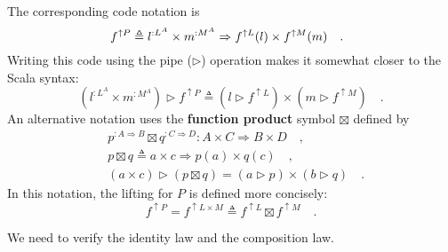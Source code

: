 \noindent The corresponding code notation is
\[
\negthickspace\negthickspace f^{\uparrow P}\triangleq l^{:L^{A}}\times m^{:M^{A}}\Rightarrow f^{\uparrow L}(l)\times f^{\uparrow M}(m)\quad.
\]
Writing this code using the pipe ($\triangleright$) operation makes
it somewhat closer to the Scala syntax:
\begin{equation}
(l^{:L^{A}}\times m^{:M^{A}})\triangleright f^{\uparrow P}\triangleq(l\triangleright f^{\uparrow L})\times(m\triangleright f^{\uparrow M})\quad.\label{eq:f-def-of-functor-product-lift}
\end{equation}
An alternative notation uses the \textbf{function
product} symbol $\boxtimes$ defined by
\begin{align*}
 & p^{:A\Rightarrow B}\boxtimes q^{:C\Rightarrow D}:A\times C\Rightarrow B\times D\quad,\\
 & p\boxtimes q\triangleq a\times c\Rightarrow p(a)\times q(c)\quad,\\
 & (a\times c)\triangleright\left(p\boxtimes q\right)=\left(a\triangleright p\right)\times\left(b\triangleright q\right)\quad.
\end{align*}
In this notation, the lifting for $P$ is defined more concisely:
\begin{equation}
f^{\uparrow P}=f^{\uparrow L\times M}\triangleq f^{\uparrow L}\boxtimes f^{\uparrow M}\quad.\label{eq:def-of-functor-product-fmap}
\end{equation}

We need to verify the identity law and the composition law.

